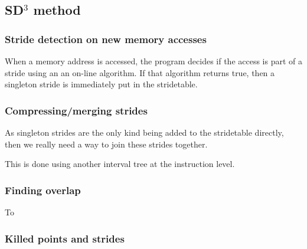 \documentclass[12pt,twoside]{reedthesis}
\begin{document}
		\subsection{SD$^3$ method}

		\subsubsection{Stride detection on new memory accesses}

		When a memory address is accessed, the program decides if the access is part of a stride using an an on-line algorithm. If that algorithm returns true, then a singleton stride is immediately put in the stridetable.

		\subsubsection{Compressing/merging strides}

		As singleton strides are the only kind being added to the stridetable directly, then we really need a way to join these strides together.

		This is done using another interval tree at the instruction level.


		\subsubsection{Finding overlap}

		To

		\subsubsection{Killed points and strides}



\end{document}
